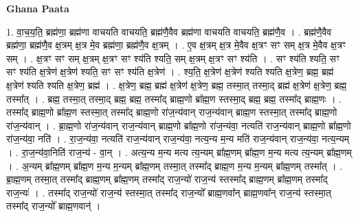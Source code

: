 \documentclass[17pt]{extarticle}
\begin{document}
\textbf{Ghana Paata } \newline

1. वा॒च॒य॒ति॒ ब्रह्म॑णा॒ ब्रह्म॑णा वाचयति वाचयति॒ ब्रह्म॑णै॒वैव ब्रह्म॑णा वाचयति वाचयति॒ ब्रह्म॑णै॒व । . ब्रह्म॑णै॒वैव ब्रह्म॑णा॒ ब्रह्म॑णै॒व क्ष॒त्रम् क्ष॒त्र मे॒व ब्रह्म॑णा॒ ब्रह्म॑णै॒व क्ष॒त्रम् । . ए॒व क्ष॒त्रम् क्ष॒त्र मे॒वैव क्ष॒त्रꣳ सꣳ सम् क्ष॒त्र मे॒वैव क्ष॒त्रꣳ सम् । . क्ष॒त्रꣳ सꣳ सम् क्ष॒त्रम् क्ष॒त्रꣳ सꣳ श्य॑ति श्यति॒ सम् क्ष॒त्रम् क्ष॒त्रꣳ सꣳ श्य॑ति । . सꣳ श्य॑ति श्यति॒ सꣳ सꣳ श्य॑ति क्ष॒त्रेण॑ क्ष॒त्रेण॑ श्यति॒ सꣳ सꣳ श्य॑ति क्ष॒त्रेण॑ । . श्य॒ति॒ क्ष॒त्रेण॑ क्ष॒त्रेण॑ श्यति श्यति क्ष॒त्रेण॒ ब्रह्म॒ ब्रह्म॑ क्ष॒त्रेण॑ श्यति श्यति क्ष॒त्रेण॒ ब्रह्म॑ । . क्ष॒त्रेण॒ ब्रह्म॒ ब्रह्म॑ क्ष॒त्रेण॑ क्ष॒त्रेण॒ ब्रह्म॒ तस्मा॒त् तस्मा॒द् ब्रह्म॑ क्ष॒त्रेण॑ क्ष॒त्रेण॒ ब्रह्म॒ तस्मा᳚त् । . ब्रह्म॒ तस्मा॒त् तस्मा॒द् ब्रह्म॒ ब्रह्म॒ तस्मा᳚द् ब्राह्म॒णो ब्रा᳚ह्म॒ण स्तस्मा॒द् ब्रह्म॒ ब्रह्म॒ तस्मा᳚द् ब्राह्म॒णः । . तस्मा᳚द् ब्राह्म॒णो ब्रा᳚ह्म॒ण स्तस्मा॒त् तस्मा᳚द् ब्राह्म॒णो रा॑ज॒न्य॑वान् राज॒न्य॑वान् ब्राह्म॒ण स्तस्मा॒त् तस्मा᳚द् ब्राह्म॒णो रा॑ज॒न्य॑वान् । . ब्रा॒ह्म॒णो रा॑ज॒न्य॑वान् राज॒न्य॑वान् ब्राह्म॒णो ब्रा᳚ह्म॒णो रा॑ज॒न्य॑वा॒ नत्यति॑ राज॒न्य॑वान् ब्राह्म॒णो ब्रा᳚ह्म॒णो रा॑ज॒न्य॑वा॒ नति॑ । . रा॒ज॒न्य॑वा॒ नत्यति॑ राज॒न्य॑वान् राज॒न्य॑वा॒ नत्य॒न्य म॒न्य मति॑ राज॒न्य॑वान् राज॒न्य॑वा॒ नत्य॒न्यम् । . रा॒ज॒न्य॑वा॒निति॑ राज॒न्य॑ - वा॒न् । . अत्य॒न्य म॒न्य मत्य त्य॒न्यम् ब्रा᳚ह्म॒णम् ब्रा᳚ह्म॒ण म॒न्य मत्य त्य॒न्यम् ब्रा᳚ह्म॒णम् । . अ॒न्यम् ब्रा᳚ह्म॒णम् ब्रा᳚ह्म॒ण म॒न्य म॒न्यम् ब्रा᳚ह्म॒णम् तस्मा॒त् तस्मा᳚द् ब्राह्म॒ण म॒न्य म॒न्यम् ब्रा᳚ह्म॒णम् तस्मा᳚त् । . ब्रा॒ह्म॒णम् तस्मा॒त् तस्मा᳚द् ब्राह्म॒णम् ब्रा᳚ह्म॒णम् तस्मा᳚द् राज॒न्यो॑ राज॒न्य॑ स्तस्मा᳚द् ब्राह्म॒णम् ब्रा᳚ह्म॒णम् तस्मा᳚द् राज॒न्यः॑ । . तस्मा᳚द् राज॒न्यो॑ राज॒न्य॑ स्तस्मा॒त् तस्मा᳚द् राज॒न्यो᳚ ब्राह्म॒णवा᳚न् ब्राह्म॒णवा᳚न् राज॒न्य॑ स्तस्मा॒त् तस्मा᳚द् राज॒न्यो᳚ ब्राह्म॒णवान्॑ । \newline
\end{document}
